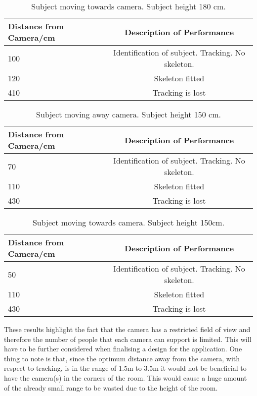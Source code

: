 \documentclass[10pt]{article}
\begin{document}
\begin{table}[h]
\center
\begin{tabular}{ | l | c |}
\hline
Distance from Camera/cm & Description of Performance \\
\hline
100 & Identification of subject. Tracking. No skeleton.\\
120 & Skeleton fitted\\
410 & Tracking is lost\\
\hline
\end{tabular}
\caption{Subject moving towards camera. Subject height 180 cm.}
\label{cam_range_180_toward}
\end{table}

\begin{table}[h]
\center
\begin{tabular}{ | l | c |}
\hline
Distance from Camera/cm & Description of Performance \\
\hline
70 & Identification of subject. Tracking. No skeleton.\\
110 & Skeleton fitted\\
430 & Tracking is lost\\
\hline
\end{tabular}
\caption{Subject moving away camera. Subject height 150 cm.}
\label{cam_range_150_away}
\end{table}

\begin{table}[h]
\center
\begin{tabular}{ | l | c |}
\hline
Distance from Camera/cm & Description of Performance \\
\hline
50 & Identification of subject. Tracking. No skeleton.\\
110 & Skeleton fitted\\
430 & Tracking is lost\\
\hline
\end{tabular}
\caption{Subject moving towards camera. Subject height 150cm.}
\label{cam_range_150_toward}
\end{table}
\noindent
These results highlight the fact that the camera has a restricted field of view and therefore the number of people that each camera can support is limited. This will have to be further considered when finalising a design for the application. One thing to note is that, since  the optimum distance away from the camera, with respect to tracking, is in the range of 1.5m to 3.5m it would not be beneficial to have the camera(s) in the corners of the room. This would cause a huge amount of the already small range to be wasted due to the height of the room. 
\end{document}
